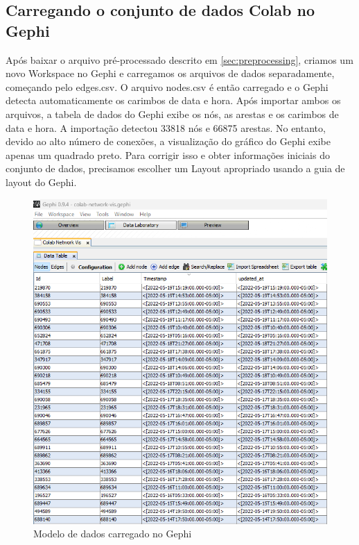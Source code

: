 \subsection*{Carregando o conjunto de dados Colab no Gephi}
Após baixar o arquivo pré-processado descrito em \autoref{sec:preprocessing}, criamos um novo Workspace no Gephi e carregamos os arquivos de dados separadamente, começando pelo edges.csv. O arquivo nodes.csv é então carregado e o Gephi detecta automaticamente os carimbos de data e hora. Após importar ambos os arquivos, a tabela de dados do Gephi exibe os nós, as arestas e os carimbos de data e hora. A importação detectou 33818 nós e 66875 arestas. No entanto, devido ao alto número de conexões, a visualização do gráfico do Gephi exibe apenas um quadrado preto. Para corrigir isso e obter informações iniciais do conjunto de dados, precisamos escolher um Layout apropriado usando a guia de layout do Gephi.

\begin{figure}[!htb]
	\caption{Modelo de dados carregado no Gephi}
	\label{fig:gephi_data_table}
	\centering
	\includegraphics[scale=0.8]{images/gephi-data-table.png}
\end{figure}

